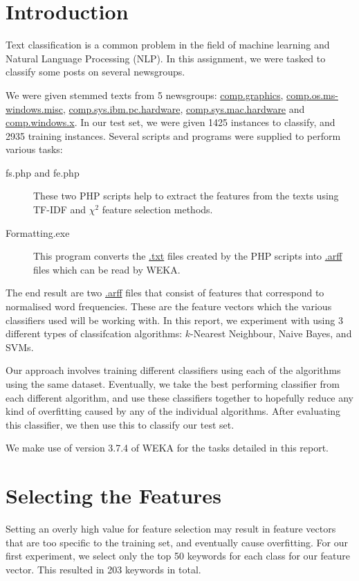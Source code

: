 \documentclass[12pt]{article}
\begin{document}
\maketitle
\section{Introduction}
Text classification is a common problem in the field of machine learning and Natural Language Processing (NLP). In this assignment, we were tasked to classify some posts on several newsgroups.

We were given stemmed texts from 5 newsgroups: \url{comp.graphics}, \url{comp.os.ms-windows.misc}, \url{comp.sys.ibm.pc.hardware}, \url{comp.sys.mac.hardware} and \url{comp.windows.x}. In our test set, we were given 1425 instances to classify, and 2935 training instances. Several scripts and programs were supplied to perform various tasks:
\begin{description}
	\item[fs.php and fe.php] These two PHP scripts help to extract the features from the texts using \textsc{TF-IDF} and $\chi^2$ feature selection methods.
	\item[Formatting.exe] This program converts the \url{.txt} files created by the PHP scripts into \url{.arff} files which can be read by WEKA.
\end{description}
The end result are two \url{.arff} files that consist of features that correspond to normalised word frequencies. These are the feature vectors which the various classifiers used will be working with. In this report, we experiment with using 3 different types of classifcation algorithms: $k$-Nearest Neighbour, Naive Bayes, and SVMs. 

Our approach involves training different classifiers using each of the algorithms using the same dataset. Eventually, we take the best performing classifier from each different algorithm, and use these classifiers together to hopefully reduce any kind of overfitting caused by any of the individual algorithms. After evaluating this classifier, we then use this to classify our test set.

We make use of version 3.7.4 of WEKA for the tasks detailed in this report.

\section{Selecting the Features}
 Setting an overly high value for feature selection may result in feature vectors that are too specific to the training set, and eventually cause overfitting. For our first experiment, we select only the top 50 keywords for each class for our feature vector. This resulted in 203 keywords in total.
\end{document}
